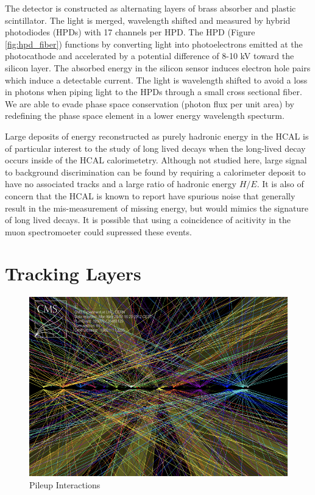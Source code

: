 The detector is constructed as alternating layers of brass absorber and plastic scintillator. 
The light is merged, wavelength shifted and measured by hybrid photodiodes (HPDs) with 17 channels per HPD. The HPD
(Figure \ref{fig:hpd_fiber}) functions by converting light into photoelectrons emitted at the photocathode and accelerated
by a potential difference of 8-10 kV toward the silicon layer. The absorbed energy in the silicon sensor induces 
electron hole pairs which induce a detectable current. The light is wavelength shifted to avoid a loss in photons 
when piping light to the HPDs through a small cross sectional fiber. We are able to evade phase space 
conservation (photon flux per unit area) by redefining the phase space element in a lower energy wavelength specturm.  {

Large deposits of energy reconstructed as purely hadronic energy in the HCAL is of particular interest 
to the study of long lived decays when the long-lived decay occurs inside of the HCAL calorimetetry. Although not studied here,
large signal to background discrimination can be found by requiring a calorimeter deposit to have no
associated tracks and a large ratio of hadronic energy $H/E$. It is also of concern that the HCAL is known to report
 have spurious noise that generally result in the mis-measurement of missing energy, but would mimics the signature
of long lived decays. It is possible that using a coincidence of acitivity in the muon spectromoeter could supressed 
these events.  

\section{Tracking Layers}

\begin{figure}
\begin{center}
\includegraphics[width=.75\textwidth]{pics/pileup_vertices}
\end{center}
\caption{Pileup Interactions}
\label{fig:pileup}
\end{figure}

}
